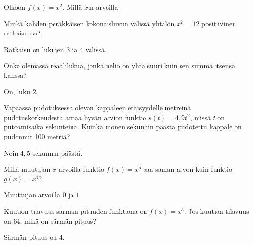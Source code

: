 \begin{tehtavasivu}
\begin{tehtava}
Olkoon $f(x)=x^2$. Millä $x$:n arvoilla
\begin{alakohdat}
\end{alakohdat}
\begin{vastaus}
\begin{alakohdat}
\end{alakohdat}
\end{vastaus}
\end{tehtava}

\begin{tehtava}
Minkä kahden peräkkäisen kokonaisluvun välissä yhtälön $x^2 = 12$ positiivinen ratkaisu on?
\begin{vastaus}
Ratkaisu on lukujen $3$ ja $4$ välissä.
\end{vastaus}
\end{tehtava}

\begin{tehtava}
Onko olemassa reaalilukua, jonka neliö on yhtä suuri kuin sen summa itsensä kanssa?
\begin{vastaus}
On, luku $2$.
\end{vastaus}
\end{tehtava}


\begin{tehtava}
Vapaassa pudotuksessa olevan kappaleen etäisyydelle metreinä pudotuskorkeudesta antaa hyvän arvion funktio $ s(t)=4,9t^{2}$, missä $t$ on putoamisaika sekunteina. Kuinka monen sekunnin päästä pudotettu kappale on pudonnut 100 metriä?
\begin{vastaus}
Noin $4,5$ sekunnin päästä.
\end{vastaus}
\end{tehtava}

\begin{tehtava}
Millä muutujan $x$ arvoilla funktio $ f(x)=x^5$ saa saman arvon kuin funktio $ g(x)=x^4$?
\begin{vastaus}
Muuttujan arvoilla $0$ ja $1$
\end{vastaus}
\end{tehtava}

\begin{tehtava}
Kuution tilavuus särmän pituuden funktiona on $f(x) = x^3$. Jos kuution tilavuus on $64$, mikä on särmän pituus?
\begin{vastaus}
Särmän pituus on $4$.
\end{vastaus}
\end{tehtava}


\end{tehtavasivu}
